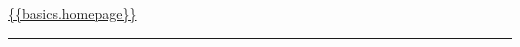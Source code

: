 \documentclass[a4paper, 10pt]{article}
\begin{document}
\begin{flushright}
  \item {}  %
  \item {\Calluna \url{ {{basics.homepage}}}}  %
\end{flushright}\vspace{-45pt}

\begin{flushleft}  %
  {\Calluna \fontsize{30pt}{30pt}\selectfont \textsc{} } \quad {\Calluna \fontsize{14.5pt}{14.5pt}}
  \noindent\rule{\textwidth}{0.4pt}
\end{flushleft}
\end{document}

